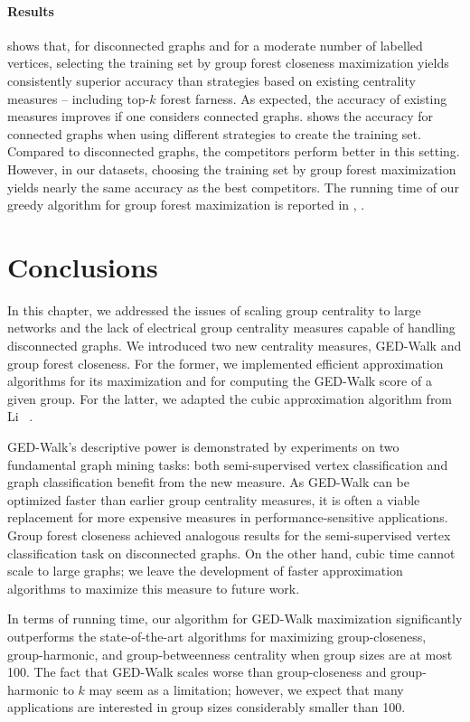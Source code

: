 \paragraph{Results}
%
 shows that, for disconnected graphs
and for a moderate number of labelled vertices, selecting the training
set by group forest closeness maximization yields consistently
superior accuracy than strategies based on existing centrality measures
-- including top-$k$ forest farness.
As expected, the accuracy of existing measures improves if one considers
connected graphs.  shows the accuracy
for connected graphs when using different strategies to create the  training set.
Compared to disconnected graphs, the competitors perform better in this setting.
However, in our datasets, choosing the training set by group forest
maximization yields nearly the same accuracy as the best competitors.
The running time of our greedy algorithm for group forest maximization
is reported in ,
.

\section{Conclusions}
%
In this chapter, we addressed the issues of scaling group centrality
to large networks and the lack of electrical group centrality measures capable
of handling disconnected graphs.
We introduced two new centrality measures, GED-Walk and group forest closeness.
For the former, we implemented efficient
approximation algorithms for its maximization and for computing the GED-Walk
score of a given group.
For the latter, we adapted the cubic approximation algorithm from
Li \etal~\cite{DBLP:conf/www/0002PSYZ19}.

GED-Walk's descriptive power is demonstrated by
experiments on two fundamental graph mining tasks: both semi-supervised vertex
classification and graph classification benefit from the new measure. As
GED-Walk can be optimized faster than earlier group centrality measures, it is
often a viable replacement for more expensive measures in performance-sensitive
applications.
Group forest closeness achieved analogous results for the semi-supervised
vertex classification task on disconnected graphs.
On the other hand, cubic time cannot scale to large graphs; we leave the
development of faster approximation algorithms to maximize this measure
to future work.

In terms of running time, our algorithm for GED-Walk
maximization significantly outperforms the state-of-the-art algorithms for
maximizing group-closeness, group-harmonic, and group-betweenness centrality
when group sizes are at most 100. The fact that GED-Walk scales worse than
group-closeness and group-harmonic \wrt
to $k$ may seem as a limitation; however, we expect that many applications are
interested in group sizes considerably smaller than 100.

